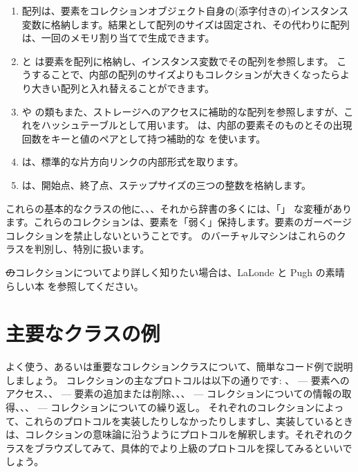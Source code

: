 \documentclass[a4paper,10pt,twoside]{book}
\begin{document}
\begin{enumerate}
  \item 配列は、要素をコレクションオブジェクト自身の(添字付きの)インスタンス変数に格納します。結果として配列のサイズは固定され、その代わりに配列は、一回のメモリ割り当てで生成できます。
  \item {} と  は要素を配列に格納し、インスタンス変数でその配列を参照します。
  こうすることで、内部の配列のサイズよりもコレクションが大きくなったらより大きい配列と入れ替えることができます。
  \item {} や  の類もまた、ストレージへのアクセスに補助的な配列を参照しますが、これをハッシュテーブルとして用います。 は、内部の要素そのものとその出現回数をキーと値のペアとして持つ補助的な  を使います。
  \item {} は、標準的な片方向リンクの内部形式を取ります。
  \item {} は、開始点、終了点、ステップサイズの三つの整数を格納します。
\end{enumerate}
これらの基本的なクラスの他に、、、それから辞書の多くには、「」 な変種があります。これらのコレクションは、要素を「弱く」保持します。\ie 要素のガーベージコレクションを禁止しないということです。
\pharo のバーチャルマシンはこれらのクラスを判別し、特別に扱います。

\st のコレクションについてより詳しく知りたい場合は、LaLonde と Pugh の素晴らしい本\cite{LaLo90a} を参照してください。

\section{主要なクラスの例}
よく使う、あるいは重要なコレクションクラスについて、簡単なコード例で説明しましょう。
コレクションの主なプロトコルは以下の通りです: 、 --- 要素へのアクセス、、 --- 要素の追加または削除、、、 --- コレクションについての情報の取得、、、 --- コレクションについての繰り返し。
それぞれのコレクションによって、これらのプロトコルを実装したりしなかったりしますし、実装しているときは、コレクションの意味論に沿うようにプロトコルを解釈します。それぞれのクラスをブラウズしてみて、具体的でより上級のプロトコルを探してみるといいでしょう。
\end{document}

